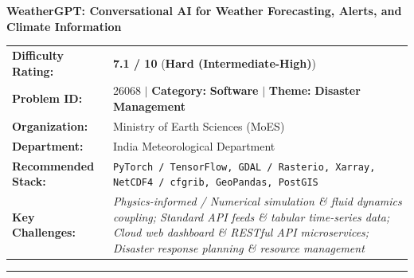 \documentclass[10pt,a4paper]{article}
\begin{document}
\begin{tcolorbox}[pscard, title={"\textbf{SIH26068} \quad $\vert$ \quad WeatherGPT: Conversational AI for Weather Forecasting, Alerts, and Climate ...}]
\textbf{\large WeatherGPT: Conversational AI for Weather Forecasting, Alerts, and Climate Information}\\[0.25cm]

\begin{tabular}{@{}lp{12.5cm}@{}}
\textbf{Difficulty Rating:} & \textcolor{diffhard}{\textbf{\Large 7.1 / 10}} \quad (\textbf{Hard (Intermediate-High)}) \\
\textbf{Problem ID:} & 26068 \quad $\vert$ \quad \textbf{Category:} \textbf{Software} \quad $\vert$ \quad \textbf{Theme:} \textbf{Disaster Management} \\
\textbf{Organization:} & Ministry of Earth Sciences (MoES) \\
\textbf{Department:} & India Meteorological Department \\
\textbf{Recommended Stack:} & \texttt{PyTorch / TensorFlow, GDAL / Rasterio, Xarray, NetCDF4 / cfgrib, GeoPandas, PostGIS} \\
\textbf{Key Challenges:} & \textit{\small Physics-informed / Numerical simulation \& fluid dynamics coupling; Standard API feeds \& tabular time-series data; Cloud web dashboard \& RESTful API microservices; Disaster response planning \& resource management} \\
\end{tabular}

\vspace{0.2cm}
\hrule
\vspace{0.2cm}


\end{tcolorbox}
\end{document}
